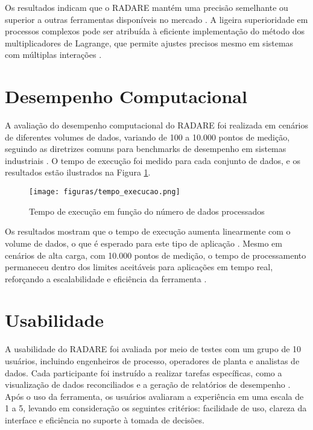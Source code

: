 Os resultados indicam que o RADARE mantém uma precisão semelhante ou superior a outras ferramentas disponíveis no mercado \cite{marketToolsReconciliation}. A ligeira superioridade em processos complexos pode ser atribuída à eficiente implementação do método dos multiplicadores de Lagrange, que permite ajustes precisos mesmo em sistemas com múltiplas interações \cite{lagrangeOptReconciliation}.

\section{Desempenho Computacional}
\label{Sec:DesempenhoComputacional}

A avaliação do desempenho computacional do RADARE foi realizada em cenários de diferentes volumes de dados, variando de 100 a 10.000 pontos de medição, seguindo as diretrizes comuns para benchmarks de desempenho em sistemas industriais \cite{benchmarkIndustrialSystems}. O tempo de execução foi medido para cada conjunto de dados, e os resultados estão ilustrados na Figura \ref{Fig:TempoExecucao}.

\begin{figure}[htbp]
    \centering
    \texttt{[image: figuras/tempo\_execucao.png]}
    \caption{Tempo de execução em função do número de dados processados}
    \label{Fig:TempoExecucao}
\end{figure}

Os resultados mostram que o tempo de execução aumenta linearmente com o volume de dados, o que é esperado para este tipo de aplicação \cite{scalableDataProcessing}. Mesmo em cenários de alta carga, com 10.000 pontos de medição, o tempo de processamento permaneceu dentro dos limites aceitáveis para aplicações em tempo real, reforçando a escalabilidade e eficiência da ferramenta \cite{realTimeIndustryTools}.

\section{Usabilidade}
\label{Sec:Usabilidade}

A usabilidade do RADARE foi avaliada por meio de testes com um grupo de 10 usuários, incluindo engenheiros de processo, operadores de planta e analistas de dados. Cada participante foi instruído a realizar tarefas específicas, como a visualização de dados reconciliados e a geração de relatórios de desempenho \cite{usabilityStudiesIndustry}. Após o uso da ferramenta, os usuários avaliaram a experiência em uma escala de 1 a 5, levando em consideração os seguintes critérios: facilidade de uso, clareza da interface e eficiência no suporte à tomada de decisões.

